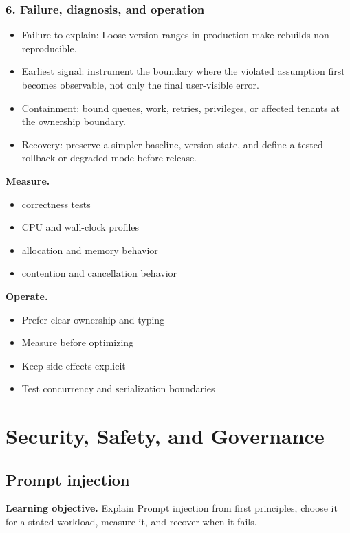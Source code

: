 \subsubsection*{6. Failure, diagnosis, and operation}
\begin{itemize}
\item Failure to explain: Loose version ranges in production make rebuilds non-reproducible.
\item Earliest signal: instrument the boundary where the violated assumption first becomes observable, not only the final user-visible error.
\item Containment: bound queues, work, retries, privileges, or affected tenants at the ownership boundary.
\item Recovery: preserve a simpler baseline, version state, and define a tested rollback or degraded mode before release.
\end{itemize}
\textbf{Measure.}\begin{itemize}
\item correctness tests
\item CPU and wall-clock profiles
\item allocation and memory behavior
\item contention and cancellation behavior
\end{itemize}
\textbf{Operate.}\begin{itemize}
\item Prefer clear ownership and typing
\item Measure before optimizing
\item Keep side effects explicit
\item Test concurrency and serialization boundaries
\end{itemize}
\clearpage\section{Security, Safety, and Governance}
\subsection{Prompt injection}
\textbf{Learning objective.} Explain Prompt injection from first principles, choose it for a stated workload, measure it, and recover when it fails.
